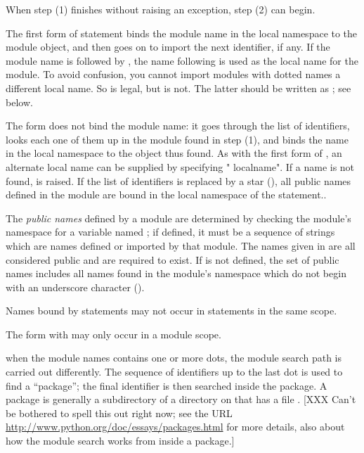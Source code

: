 When step (1) finishes without raising an exception, step (2) can
begin.

The first form of  statement binds the module name in
the local namespace to the module object, and then goes on to import
the next identifier, if any.  If the module name is followed by
, the name following  is used as the local
name for the module. To avoid confusion, you cannot import modules
with dotted names  a different local name. So  is legal, but  is not.
The latter should be written as ;
see below.

The  form does not bind the module name: it goes through the
list of identifiers, looks each one of them up in the module found in step
(1), and binds the name in the local namespace to the object thus found. 
As with the first form of , an alternate local name can be
supplied by specifying " localname".  If a name is not found,
 is raised.  If the list of identifiers is replaced
by a star (\character{*}), all public names defined in the module are
bound in the local namespace of the  statement..

The \emph{public names} defined by a module are determined by checking
the module's namespace for a variable named ; if
defined, it must be a sequence of strings which are names defined or
imported by that module.  The names given in  are all
considered public and are required to exist.  If  is not
defined, the set of public names includes all names found in the
module's namespace which do not begin with an underscore character
(\character{_}).

Names bound by  statements may not occur in
 statements in the same scope.

The  form with \samp{*} may only occur in a module scope.

when the module names contains one or more dots, the module search
path is carried out differently.  The sequence of identifiers up to
the last dot is used to find a ``package''; the final
identifier is then searched inside the package.  A package is
generally a subdirectory of a directory on  that has a
file .
%
[XXX Can't be bothered to spell this out right now; see the URL
\url{http://www.python.org/doc/essays/packages.html} for more details, also
about how the module search works from inside a package.]

